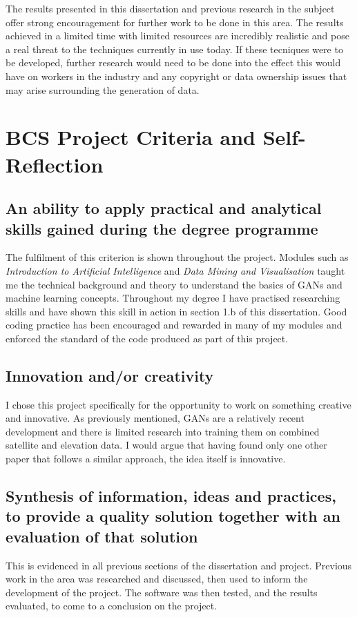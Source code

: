 \documentclass[a4paper]{report}
\begin{document}
The results presented in this dissertation and previous research in the subject offer strong encouragement for further work to be done in this area. The results achieved in a limited time with limited resources are incredibly realistic and pose a real threat to the techniques currently in use today. If these tecniques were to be developed, further research would need to be done into the effect this would have on workers in the industry and any copyright or data ownership issues that may arise surrounding the generation of data.
\section{BCS Project Criteria and Self-Reflection}
\subsection{An ability to apply practical and analytical skills gained during the degree programme}
The fulfilment of this criterion is shown throughout the project. Modules such as \textit{Introduction to Artificial Intelligence} and \textit{Data Mining and Visualisation} taught me the technical background and theory to understand the basics of GANs and machine learning concepts. Throughout my degree I have practised researching skills and have shown this skill in action in section 1.b of this dissertation. Good coding practice has been encouraged and rewarded in many of my modules and enforced the standard of the code produced as part of this project.
\subsection{Innovation and/or creativity}
I chose this project specifically for the opportunity to work on something creative and innovative. As previously mentioned, GANs are a relatively recent development and there is limited research into training them on combined satellite and elevation data. I would argue that having found only one other paper that follows a similar approach, the idea itself is innovative. 
\subsection{Synthesis of information, ideas and practices, to provide a quality solution together with an evaluation of that solution}
This is evidenced in all previous sections of the dissertation and project. Previous work in the area was researched and discussed, then used to inform the development of the project. The software was then tested, and the results evaluated, to come to a conclusion on the project.
\end{document}
